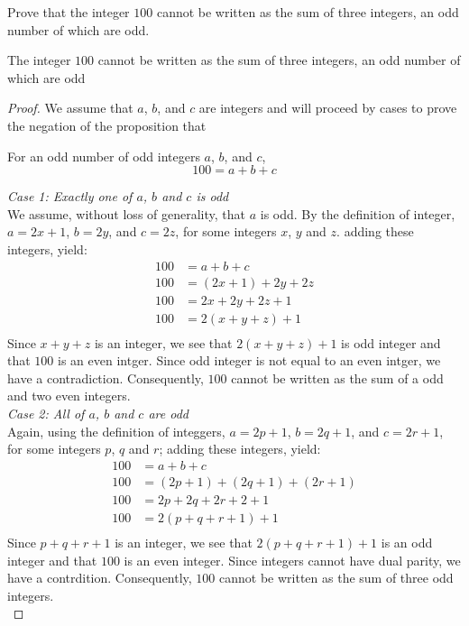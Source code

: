 \newpage
\begin{example}
Prove that the integer $100$ cannot be written as the sum of three integers, an odd number of which are odd. 
\begin{tcolorbox}
    \begin{theorem}
        The integer $100$ cannot be written as the sum of three integers, an odd number of which are odd 
    \end{theorem}
\end{tcolorbox}

\begin{proof}
    We assume that $a$, $b$, and $c$ are integers and will proceed by cases to prove the negation of the proposition that  
        \begin{center}
            For an odd number of odd integers $a$, $b$, and $c$,
                \begin{equation*}
                    100 = a + b + c
                \end{equation*}
        \end{center}
    \textit{Case 1: Exactly one of $a$, $b$ and $c$ is odd} \\
        We assume, without loss of generality, that $a$ is odd. By the definition of integer, $a = 2x + 1$, $b = 2y$, and $c = 2z$, for some integers $x$, $y$ and $z$. adding these integers, yield:
            \begin{align*}
                100 & = a + b + c \\
                100 & = (2x + 1) + 2y + 2z \\
                100 & = 2x + 2y + 2z + 1 \\
                100 & = 2(x + y + z) + 1 \\
            \end{align*}
        Since $x + y + z$ is an integer, we see that $2(x + y + z) + 1$ is odd integer and that $100$ is an even intger. Since odd integer is not equal to an even intger, we have a contradiction. Consequently, $100$ cannot be written as the sum of a odd and two even integers. \\
    
    \textit{Case 2: All of $a$, $b$ and $c$ are odd} \\
        Again, using the definition of integgers, $a = 2p + 1$, $b = 2q + 1$, and $c = 2r + 1$, for some integers $p$, $q$ and $r$; adding these integers, yield:
            \begin{align*}
                100 & = a + b + c \\
                100 & = (2p + 1) + (2q + 1) + (2r + 1) \\
                100 & = 2p + 2q + 2r + 2 + 1 \\
                100 & = 2(p + q + r + 1) + 1 \\
            \end{align*}
        Since $p + q + r + 1$ is an integer, we see that $2(p + q + r + 1) + 1$ is an odd integer and that $100$ is an even integer. Since integers cannot have dual parity, we have a contrdition. Consequently, $100$ cannot be written as the sum of three odd integers. \\
        

\end{proof}
\end{example}
